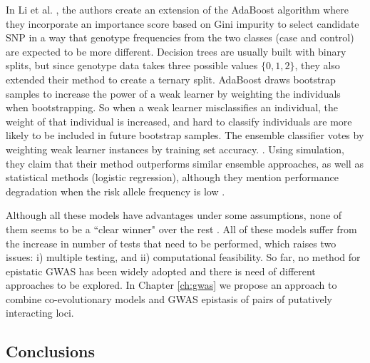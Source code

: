 \begin{enumerate}
In Li et al. \cite{li2011detecting}, the authors create an extension of the AdaBoost algorithm where they incorporate an importance score based on Gini impurity to select candidate SNP  in a way that genotype frequencies from the two classes (case and control) are expected to be more different.
Decision trees are usually built with binary splits, but since genotype data takes three possible values $\{0, 1, 2\}$, they also extended their method to create a ternary split.
AdaBoost draws bootstrap samples to increase the power of a weak learner by weighting the individuals when bootstrapping. 
So when a weak learner misclassifies an individual, the weight of that individual is increased, and hard to classify individuals are more likely to be included in future bootstrap samples. 
The ensemble classifier votes by weighting weak learner instances by training set accuracy.  \cite{li2011detecting}.
Using simulation, they claim that their method outperforms similar ensemble approaches, as well as statistical methods (logistic regression), although they mention performance degradation when the risk allele frequency is low \cite{li2011detecting}.

\end{enumerate}

Although all these models have advantages under some assumptions, none of them seems to be a ``clear winner" over the rest \cite{cordell2009detecting}. 
All of these models suffer from the increase in number of tests that need to be performed, which raises two issues: 
i) multiple testing, and 
ii) computational feasibility.
So far, no method for epistatic GWAS has been widely adopted and there is need of different approaches to be explored. In Chapter \ref{ch:gwas} we propose an approach to combine co-evolutionary models and GWAS epistasis of pairs of putatively interacting loci.

\subsection{Conclusions \label{sec:epigwas}}

